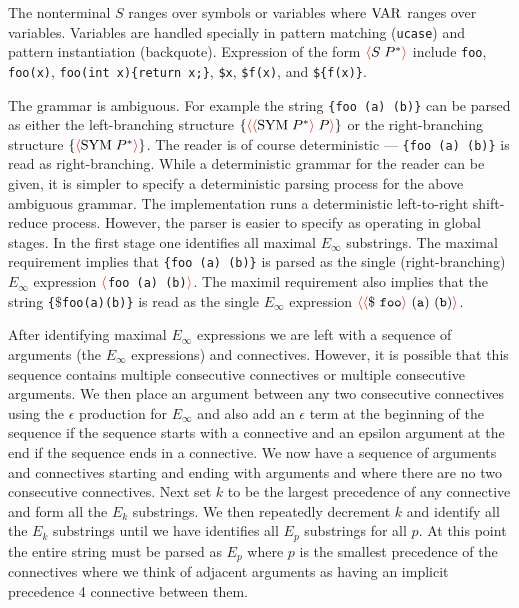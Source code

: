 \documentclass{article}
\newcommand{\fopen}{{\color{red} \langle}}
\newcommand{\fclose}{{\color{red} \rangle}}
\begin{document}
The nonterminal $S$ ranges over symbols or variables where $\mathrm{VAR}$ ranges over variables.  Variables are handled specially in pattern matching ({\tt ucase}) and pattern instantiation (backquote).
Expression of the form $\fopen S\;P^*\fclose$ include {\tt foo}, {\tt foo(x)}, {\tt foo(int x)\{return x;\}},
{\tt \$x}, {\tt \$f(x)}, and {\tt \$\{f(x)\}}.


The grammar is ambiguous.  For example the string {\tt \{foo (a) (b)\}} can be parsed as either the left-branching structure $\{\fopen\fopen\sym\;P^*\fclose\;P\fclose\}$
or the  right-branching structure $\{\fopen\sym\;P^*\fclose\}$.
The reader is of course deterministic --- {\tt \{foo (a) (b)\}} is read as right-branching.  While a deterministic grammar for the reader can be given, it is simpler
to specify a deterministic parsing process for the above ambiguous grammar.
The implementation runs a deterministic left-to-right shift-reduce process.
However, the parser is easier to specify as operating in global stages.  In the first stage one identifies all maximal $E_\infty$ substrings.
The maximal requirement implies that {\tt \{foo (a) (b)\}} is parsed as the single (right-branching)
$E_\infty$ expression $\fopen${\tt foo (a) (b)}$\fclose$. The maximil requirement also implies that the string {\tt \{$\$$\;foo\;(a)\;(b)\}} is read as the single $E_\infty$
expression $\fopen \fopen \mathtt{\$~foo}\fclose\ \mathtt{(a)~(b)} \fclose$.

After identifying maximal $E_\infty$ expressions we are left with a sequence of arguments (the $E_\infty$ expressions) and connectives.
However, it is possible that this sequence contains multiple consecutive connectives or multiple consecutive arguments.  We then place an argument between any two consecutive
connectives using the $\epsilon$ production for $E_\infty$ and also add an $\epsilon$ term at the beginning of the sequence if the sequence starts with a connective and an
epsilon argument at the end if the sequence ends in a connective.  We now have a sequence of arguments and connectives starting and ending with arguments and where there
are no two consecutive connectives.  Next set $k$ to be the largest precedence of any connective and form all the $E_k$ substrings. We then repeatedly decrement $k$ and identify all the $E_k$ substrings
until we have identifies all $E_p$ substrings for all $p$.  At this point the entire string must be parsed as $E_p$ where $p$ is the smallest precedence of the connectives
where we think of adjacent arguments as having an implicit precedence 4 connective between them.
\end{document}
